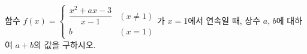 함수 $f(x)=\begin{cases} \dfrac{x^2+ax-3}{x-1} & (x\ne 1) \\ b & (x=1) \end{cases}$가 $x=1$에서 연속일 때, 상수 $a$, $b$에 대하여 $a+b$의 값을 구하시오.
